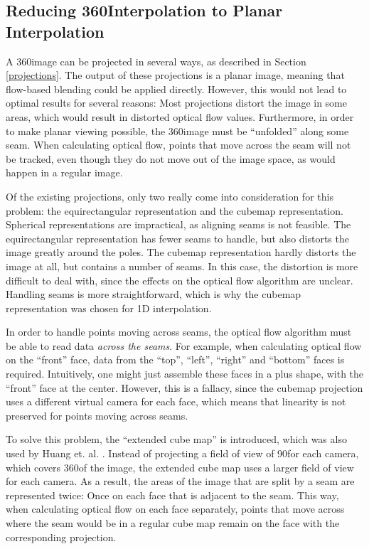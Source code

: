 \subsection{Reducing 360\degree Interpolation to Planar Interpolation}

A 360\degree image can be projected in several ways, as described in Section \ref{projections}. The output of these projections is a planar image, meaning that flow-based blending could be applied directly. However, this would not lead to optimal results for several reasons: Most projections distort the image in some areas, which would result in distorted optical flow values. Furthermore, in order to make planar viewing possible, the 360\degree image must be ``unfolded'' along some seam. When calculating optical flow, points that move across the seam will not be tracked, even though they do not move out of the image space, as would happen in a regular image.

Of the existing projections, only two really come into consideration for this problem: the equirectangular representation and the cubemap representation. Spherical representations are impractical, as aligning seams is not feasible. The equirectangular representation has fewer seams to handle, but also distorts the image greatly around the poles. The cubemap representation hardly distorts the image at all, but contains a number of seams. In this case, the distortion is more difficult to deal with, since the effects on the optical flow algorithm are unclear. Handling seams is more straightforward, which is why the cubemap representation was chosen for 1D interpolation.

In order to handle points moving across seams, the optical flow algorithm must be able to read data \emph{across the seams}. For example, when calculating optical flow on the ``front'' face, data from the ``top'', ``left'', ``right'' and ``bottom'' faces is required. Intuitively, one might just assemble these faces in a plus shape, with the ``front'' face at the center. However, this is a fallacy, since the cubemap projection uses a different virtual camera for each face, which means that linearity is not preserved for points moving across seams.


To solve this problem, the ``extended cube map'' is introduced, which was also used by Huang et. al. \cite{6dof}. Instead of projecting a field of view of 90\degree for each camera, which covers 360\degree of the image, the extended cube map uses a larger field of view for each camera. As a result, the areas of the image that are split by a seam are represented twice: Once on each face that is adjacent to the seam. This way, when calculating optical flow on each face separately, points that move across where the seam would be in a regular cube map remain on the face with the corresponding projection. 

